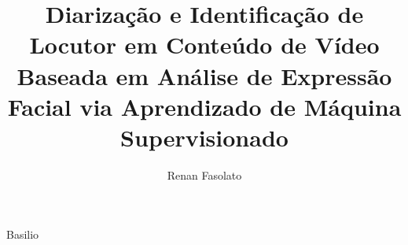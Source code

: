 \title{Diarização e Identificação de Locutor em Conteúdo de Vídeo Baseada em Análise de Expressão Facial via Aprendizado de Máquina Supervisionado}
\author{Renan Fasolato}{Basilio}












\date{\the\month}{\the\year}


\maketitle
\frontmatter

\makecatalog

\dedication{Aos meus pais, que sempre me apoiaram durante toda essa jornada, e minha noiva Allison, que esteve sempre ao meu lado e esperou por mim durante todos esses anos.}

\tableofcontents